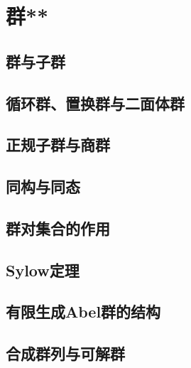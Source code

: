 \section{群**}
\subsection{群与子群}
\clearpage
\subsection{循环群、置换群与二面体群}
\clearpage
\subsection{正规子群与商群}
\clearpage
\subsection{同构与同态}
\clearpage
\subsection{群对集合的作用}
\clearpage
\subsection{Sylow定理}
\clearpage
\subsection{有限生成Abel群的结构}
\clearpage
\subsection{合成群列与可解群}
\clearpage
